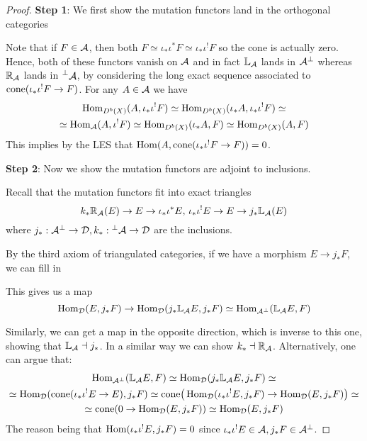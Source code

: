 \begin{proof}
    \textbf{Step 1}: We first show the mutation functors land in the orthogonal categories

    Note that if $F\in \mathcal{A}$, then both $F\simeq \iota_*\iota^* F \simeq \iota_*\iota^! F$ so the cone is actually zero. Hence, both of these functors vanish on $\mathcal{A}$ and in fact $\mathbb{L}_{\mathcal{A}}$ lands in $\mathcal{A}^\perp$ whereas $\mathbb{R}_{\mathcal{A}}$ lands in $\prescript{\perp}{}{\mathcal{A}}$, by considering the long exact sequence associated to $\operatorname{cone}(\iota_*\iota^!F\to F)$. For any $A\in \mathcal{A}$ we have
    \begin{gather*}
        \operatorname{Hom}_{D^b(X)}(A, \iota_*\iota^!F)
            \simeq \operatorname{Hom}_{D^b(X)}(\iota_* A, \iota_*\iota^!F)\simeq \\
            \simeq \operatorname{Hom}_{\mathcal{A}}(A, \iota^!F)\simeq \operatorname{Hom}_{D^b(X)}(\iota_* A, F)
            \simeq \operatorname{Hom}_{D^b(X)}(A, F)
    \end{gather*}
    This implies by the LES that $\operatorname{Hom}(A,\operatorname{cone}(\iota_*\iota^!F\to F))=0$.

    \textbf{Step 2}: Now we show the mutation functors are adjoint to inclusions.

    Recall that the mutation functors fit into exact triangles $$k_*\mathbb{R}_{\mathcal{A}} (E)\rightarrow E \rightarrow \iota_* \iota^* E,\, \iota_* \iota^! E \rightarrow E \rightarrow j_*\mathbb{L}_{\mathcal{A}}(E)$$
    where $j_*: \mathcal{A}^\perp \rightarrow \mathcal{D}, k_*: \prescript{\perp}{}{}\mathcal{A}\rightarrow \mathcal{D}$ are the inclusions.

    By the third axiom of triangulated categories, if we have a morphism $E\rightarrow j_*F$, we can fill in 
    \begin{center}
    \end{center}
    
    This gives us a map $$\operatorname{Hom}_{\mathcal{D}}(E, j_*F)\rightarrow \operatorname{Hom}_{\mathcal{D}}(j_*\mathbb{L}_{\mathcal{A}} E, j_*F)\simeq \operatorname{Hom}_{\mathcal{A}^\perp}(\mathbb{L}_{\mathcal{A}} E, F)$$
    
    Similarly, we can get a map in the opposite direction, which is inverse to this one, showing that $\mathbb{L}_{\mathcal{A}} \dashv j_*$. In a similar way we can show $k_* \dashv \mathbb{R}_{\mathcal{A}}$. Alternatively, one can argue that:
    \begin{gather*}
        \operatorname{Hom}_{\mathcal{A}^\perp}(\mathbb{L}_{\mathcal{A}} E, F)\simeq \operatorname{Hom}_{\mathcal{D}}(j_*\mathbb{L}_{\mathcal{A}} E, j_*F) \simeq \\
        \simeq \operatorname{Hom}_{\mathcal{D}} (\mathrm{cone}(\iota_* \iota^! E \rightarrow E), j_*F)\simeq \mathrm{cone}\big(\operatorname{Hom}_{\mathcal{D}}(\iota_* \iota^! E, j_* F)\rightarrow \operatorname{Hom}_{\mathcal{D}}(E, j_*F)\big)\simeq \\
        \simeq \mathrm{cone}(0\rightarrow \operatorname{Hom}_{\mathcal{D}}(E, j_*F))\simeq \operatorname{Hom}_{\mathcal{D}}(E, j_*F)
    \end{gather*}
    The reason being that $\operatorname{Hom}(\iota_* \iota^! E, j_* F)=0$ since $\iota_* \iota^! E\in \mathcal{A}, j_*F \in \mathcal{A}^\perp$. 


\end{proof}
